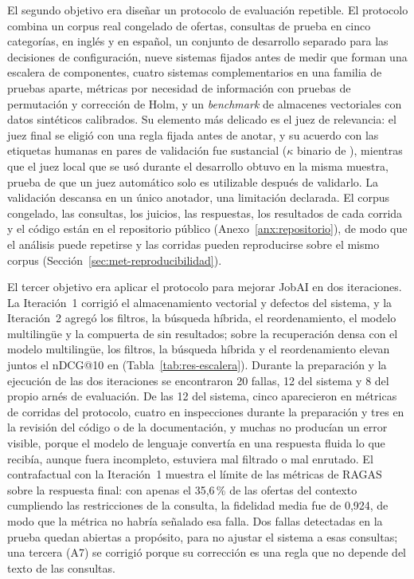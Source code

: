 El segundo objetivo era diseñar un protocolo de evaluación repetible. El protocolo combina un corpus real congelado de \cOfertas{} ofertas, \cConsultasPrueba{} consultas de prueba en cinco categorías, en inglés y en español, un conjunto de desarrollo separado para las decisiones de configuración, nueve sistemas fijados antes de medir que forman una escalera de componentes, cuatro sistemas complementarios en una familia de pruebas aparte, métricas por necesidad de información con pruebas de permutación y corrección de Holm, y un \textit{benchmark} de almacenes vectoriales con datos sintéticos calibrados. Su elemento más delicado es el juez de relevancia: el juez final se eligió con una regla fijada antes de anotar, y su acuerdo con las etiquetas humanas en \cParesValidacion{} pares de validación fue sustancial ($\kappa$ binario de \cKappaBinIC), mientras que el juez local que se usó durante el desarrollo obtuvo \cKappaLocal{} en la misma muestra, prueba de que un juez automático solo es utilizable después de validarlo. La validación descansa en un único anotador, una limitación declarada. El corpus congelado, las consultas, los juicios, las respuestas, los resultados de cada corrida y el código están en el repositorio público (Anexo~\ref{anx:repositorio}), de modo que el análisis puede repetirse y las corridas pueden reproducirse sobre el mismo corpus (Sección~\ref{sec:met-reproducibilidad}).

El tercer objetivo era aplicar el protocolo para mejorar JobAI en dos iteraciones. La Iteración~1 corrigió el almacenamiento vectorial y defectos del sistema, y la Iteración~2 agregó los filtros, la búsqueda híbrida, el reordenamiento, el modelo multilingüe y la compuerta de sin resultados; sobre la recuperación densa con el modelo multilingüe, los filtros, la búsqueda híbrida y el reordenamiento elevan juntos el nDCG@10 en \cDifCompletaDensoIC{} (Tabla~\ref{tab:res-escalera}). Durante la preparación y la ejecución de las dos iteraciones se encontraron 20 fallas, 12 del sistema y 8 del propio arnés de evaluación. De las 12 del sistema, cinco aparecieron en métricas de corridas del protocolo, cuatro en inspecciones durante la preparación y tres en la revisión del código o de la documentación, y muchas no producían un error visible, porque el modelo de lenguaje convertía en una respuesta fluida lo que recibía, aunque fuera incompleto, estuviera mal filtrado o mal enrutado. El contrafactual con la Iteración~1 muestra el límite de las métricas de RAGAS sobre la respuesta final: con apenas el 35,6\,\% de las ofertas del contexto cumpliendo las restricciones de la consulta, la fidelidad media fue de 0,924, de modo que la métrica no habría señalado esa falla. Dos fallas detectadas en la prueba quedan abiertas a propósito, para no ajustar el sistema a esas consultas; una tercera (A7) se corrigió porque su corrección es una regla que no depende del texto de las consultas.

